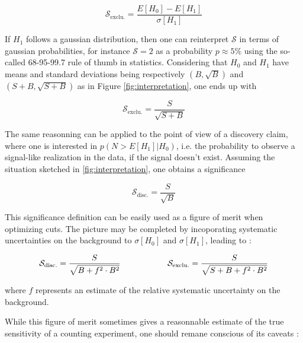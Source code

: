     $$ \mathcal{S}_\text{exclu.} = \frac{E[H_0] - E[H_1]}{\sigma[H_1]}$$

    If $H_1$ follows a gaussian distribution, then one can reinterpret $\mathcal{S}$ in terms
    of gaussian probabilities, for instance $\mathcal{S} = 2$ as a probability $p\approx5\%$
    using the so-called 68-95-99.7 rule of thumb in statistics. Considering that $H_0$ and
    $H_1$ have means and standard deviations being respectively $(B,\sqrt{B})$ and
    $(S+B,\sqrt{S+B})$ as in Figure \ref{fig:interpretation}, one ends up with

    $$ \mathcal{S}_\text{exclu.} = \frac{S}{\sqrt{S+B}}$$

    The same reasonning can be applied to the point of view of a discovery claim, where
    one is interested in $p(N > E[H_1]|H_0)$, i.e. the probability to observe a
    signal-like realization in the data, if the signal doesn't exist. Assuming the situation
    sketched in \ref{fig:interpretation}, one obtains a significance

    $$ \mathcal{S}_\text{disc.} = \frac{S}{\sqrt{B}}$$

    This significance definition can be easily used as a figure of merit when optimizing
    cuts. The picture may be completed by incoporating systematic uncertainties on the
    background to $\sigma[H_0]$ and $\sigma[H_1]$, leading to :

    \begin{equation}
       \mathcal{S}_\text{disc.} = \frac{S}{\sqrt{B+f^2 \cdot B^2}}
       \hspace*{2cm}
       \mathcal{S}_\text{exclu.} = \frac{S}{\sqrt{S+B+f^2 \cdot B^2}}
       \label{FoM}
   \end{equation}

    where $f$ represents an estimate of the relative systematic uncertainty on the background.

    While this figure of merit sometimes gives a reasonnable estimate of the true
    sensitivity of a counting experiment, one should remane conscious of its caveats
    \cite{Punzi} :

